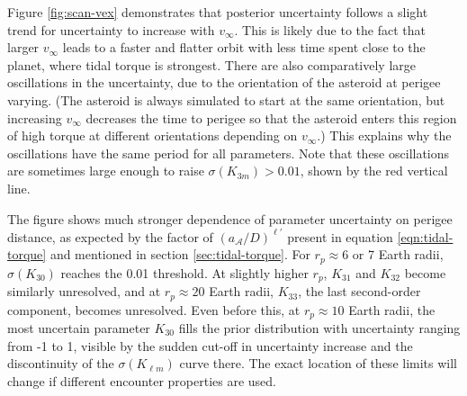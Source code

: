 \documentclass[fleqn,usenatbib]{mnras}
\begin{document}
Figure \ref{fig:scan-vex} demonstrates that posterior uncertainty follows a slight trend for uncertainty to increase with $v_\infty$. This is likely due to the fact that larger $v_\infty$ leads to a faster and flatter orbit with less time spent close to the planet, where tidal torque is strongest. There are also comparatively large oscillations in the uncertainty, due to the orientation of the asteroid at perigee varying. (The asteroid is always simulated to start at the same orientation, but increasing $v_\infty$ decreases the time to perigee so that the asteroid enters this region of high torque at different orientations depending on $v_\infty$.) This explains why the oscillations have the same period for all parameters. Note that these oscillations are sometimes large enough to raise $\sigma(K_{3m}) > 0.01$, shown by the red vertical line.


The figure shows much stronger dependence of parameter uncertainty on perigee distance, as expected by the factor of $(a_\mathcal{A}/D)^{\ell'}$ present in equation \ref{eqn:tidal-torque} and mentioned in section \ref{sec:tidal-torque}. For $r_p \approx 6$ or 7 Earth radii, $\sigma(K_{30})$ reaches the 0.01 threshold. At slightly higher $r_p$, $K_{31}$ and $K_{32}$ become similarly unresolved, and at $r_p \approx 20$ Earth radii, $K_{33}$, the last second-order component, becomes unresolved. Even before this, at $r_p \approx 10$ Earth radii, the most uncertain parameter $K_{30}$ fills the prior distribution with uncertainty ranging from -1 to 1, visible by the sudden cut-off in uncertainty increase and the discontinuity of the $\sigma(K_{\ell m})$ curve there. The exact location of these limits will change if different encounter properties are used.

\end{document}
